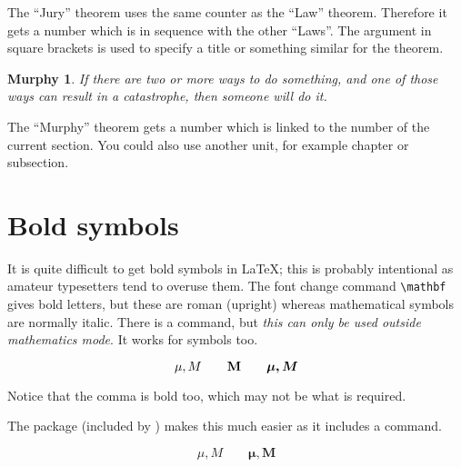 The ``Jury'' theorem uses the same counter as the ``Law''
theorem. Therefore it gets a number which is in sequence with
the other ``Laws''. The argument in square brackets is used to specify 
a title or something similar for the theorem.

\begin{example}
\flushleft
\newtheorem{mur}{Murphy}[section]
\begin{mur}
If there are two or more 
ways to do something, and 
one of those ways can result 
in a catastrophe, then 
someone will do it.\end{mur}
\end{example}

The ``Murphy'' theorem gets a number which is linked to the number of
the current section. You could also use another unit, for example chapter or
subsection.

\section{Bold symbols}

It is quite difficult to get bold symbols in \LaTeX{}; this is 
probably intentional as amateur typesetters tend to overuse them.
The font change command \verb|\mathbf| gives bold letters, but these are
roman (upright) whereas mathematical symbols are normally italic.
There is a  command, but \emph{this can only be
used outside mathematics mode}. It works for symbols too.

\begin{example}
\begin{displaymath}
\mu, M \qquad \mathbf{M} \qquad
\mbox{\boldmath $\mu, M$}
\end{displaymath}
\end{example}

\noindent
Notice that the comma is bold too, which may not be what is required.

The package  (included by ) makes this much
easier as it includes a  command.

\ifx\boldsymbol\undefined\else
\begin{example}
\begin{displaymath}
\mu, M \qquad
\boldsymbol{\mu}, \boldsymbol{M}
\end{displaymath}
\end{example}
\fi





